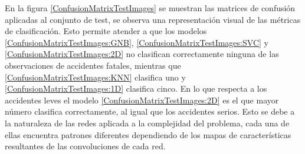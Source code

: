     En la figura \eqref{ConfusionMatrixTestImages} se muestran las matrices de confusión aplicadas al conjunto de test, se observa una representación visual de las métricas de clasificación. Esto permite atender a que los modelos  \eqref{ConfusionMatrixTestImages:GNB},  \eqref{ConfusionMatrixTestImages:SVC} y  \eqref{ConfusionMatrixTestImages:2D} no clasifican correctamente ninguna de las observaciones de accidentes fatales, mientras que  \eqref{ConfusionMatrixTestImages:KNN} clasifica uno y  \eqref{ConfusionMatrixTestImages:1D} clasifica cinco. En lo que respecta a los accidentes leves el modelo  \eqref{ConfusionMatrixTestImages:2D} es el que mayor número clasifica correctamente, al igual que los accidentes serios. Esto se debe a la naturaleza de las redes aplicada a la complejidad del problema, cada una de ellas encuentra patrones diferentes dependiendo de los mapas de características resultantes de las convoluciones de cada red.

